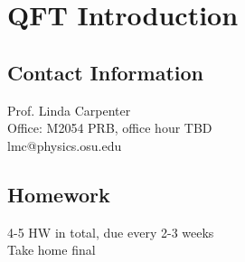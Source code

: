 \documentclass{article}
\begin{document}
\section*{QFT Introduction} 
\subsection*{Contact Information}
Prof. Linda Carpenter \\
Office: M2054 PRB, office hour TBD\\ 
lmc@physics.osu.edu
\subsection*{Homework}
4-5 HW in total, due every 2-3 weeks \\
Take home final 
\end{document}
